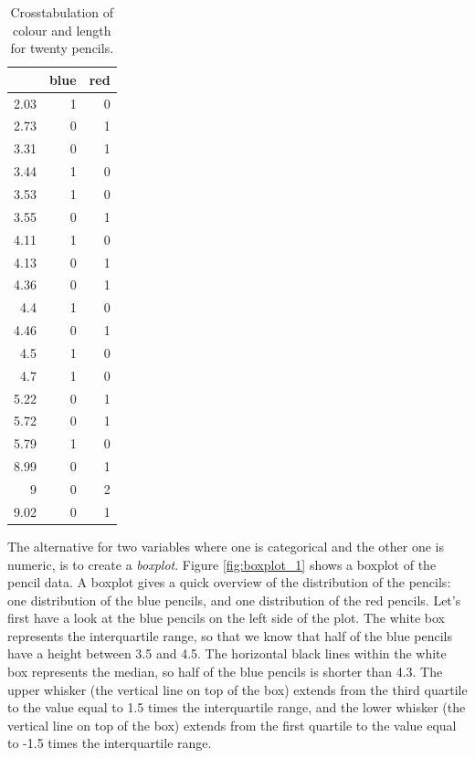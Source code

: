 \documentclass[]{report}\usepackage[]{graphicx}\usepackage[]{color}
\begin{document}
\begin{table}[ht]
\centering
\caption{Crosstabulation of colour and length for twenty pencils.} 
\label{tab:crosstable_2}
\begin{tabular}{rrr}
  \hline
 & blue & red \\ 
  \hline
2.03 &   1 &   0 \\ 
  2.73 &   0 &   1 \\ 
  3.31 &   0 &   1 \\ 
  3.44 &   1 &   0 \\ 
  3.53 &   1 &   0 \\ 
  3.55 &   0 &   1 \\ 
  4.11 &   1 &   0 \\ 
  4.13 &   0 &   1 \\ 
  4.36 &   0 &   1 \\ 
  4.4 &   1 &   0 \\ 
  4.46 &   0 &   1 \\ 
  4.5 &   1 &   0 \\ 
  4.7 &   1 &   0 \\ 
  5.22 &   0 &   1 \\ 
  5.72 &   0 &   1 \\ 
  5.79 &   1 &   0 \\ 
  8.99 &   0 &   1 \\ 
  9 &   0 &   2 \\ 
  9.02 &   0 &   1 \\ 
   \hline
\end{tabular}
\end{table}



The alternative for two variables where one is categorical and the other one is numeric, is to create a \textit{boxplot}. Figure \ref{fig:boxplot_1} shows a boxplot of the pencil data. A boxplot gives a quick overview of the distribution of the pencils: one distribution of the blue pencils, and one distribution of the red pencils. Let's first have a look at the blue pencils on the left side of the plot. The white box represents the interquartile range, so that we know that half of the blue pencils have a height between 3.5 and 4.5. The horizontal black lines within the white box represents the median, so half of the blue pencils is shorter than 4.3. The upper whisker (the vertical line on top of the box) extends from the third quartile to the value equal to 1.5 times the interquartile range, and the lower whisker (the vertical line on top of the box) extends from the first quartile to the value equal to -1.5 times the interquartile range. 
\end{document}
